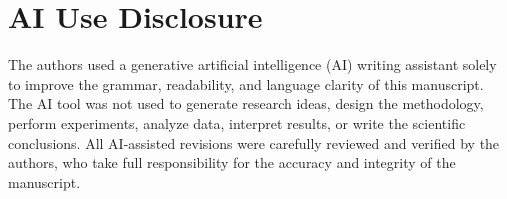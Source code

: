 \documentclass[conference]{IEEEtran}
\begin{document}
\section*{AI Use Disclosure}
The authors used a generative artificial intelligence (AI) writing assistant solely to improve the grammar, readability, and language clarity of this manuscript. The AI tool was not used to generate research ideas, design the methodology, perform experiments, analyze data, interpret results, or write the scientific conclusions. All AI-assisted revisions were carefully reviewed and verified by the authors, who take full responsibility for the accuracy and integrity of the manuscript.




\end{document}

